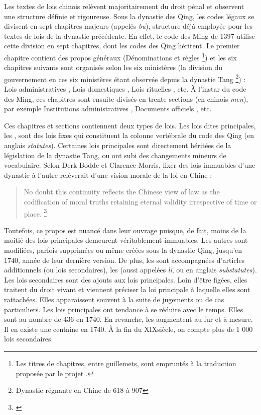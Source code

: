 Les textes de lois chinois relèvent majoritairement du droit pénal et observent une structure définie et rigoureuse. Sous la dynastie des Qing, les codes légaux se divisent en sept chapitres majeurs (appelés \textit{bu}), structure déjà employée pour les textes de lois de la dynastie précédente. En effet, le code des Ming de 1397 utilise cette division en sept chapitres, dont les codes des Qing héritent. Le premier chapitre contient des propos généraux (\og Dénominations et règles \fg \footnote{Les titres de chapitres, entre guillemets, sont empruntés à la traduction proposée par le projet \LSC.}) et les six chapitres suivants sont organisés selon les six ministères (la division du gouvernement en ces six ministères étant observée depuis la dynastie Tang \footnote{Dynastie régnante en Chine de 618 à 907}) : \og Lois administratives \fg, \og Lois domestiques \fg, \og Lois rituelles \fg, etc. À l'instar du code des Ming, ces chapitres sont ensuite divisés en trente sections (en chinois \textit{men}), par exemple \og Institutions administratives \fg, \og Documents officiels \fg, etc. 

Ces chapitres et sections contiennent deux types de lois. Les lois dites principales, les \lu, sont des lois fixes qui constituent la colonne vertébrale du code des Qing (en anglais \textit{statutes}). Certaines lois principales sont directement héritées de la législation de la dynastie Tang, ou ont subi des changements mineurs de vocabulaire. Selon Derk Bodde et Clarence Morris, fixer des lois immuables d'une dynastie à l'autre relèverait d'une vision morale de la loi en Chine : 
\begin{quote}
    No doubt this continuity reflects the Chinese view of law as the codification of moral truths retaining eternal validity irrespective of time or place. \footnote{\cite{law_in_imperial_china}}
\end{quote}

Toutefois, ce propos est nuancé dans leur ouvrage puisque, de fait, moins de la moitié des lois principales demeurent véritablement immuables. Les autres \lu sont modifiées, parfois supprimées ou même créées sous la dynastie Qing, jusqu'en 1740, année de leur dernière version. De plus, les \lu sont accompagnées d'articles additionnels (ou lois secondaires), les \li (aussi appelées \textit{li}, ou en anglais \textit{substatutes}). Les lois secondaires sont des ajouts aux lois principales. Loin d'être figées, elles traitent du droit vivant et viennent préciser la loi principale à laquelle elles sont rattachées. Elles apparaissent souvent à la suite de jugements ou de cas particuliers. Les lois principales ont tendance à se réduire avec le temps. Elles sont au nombre de 436 en 1740. En revanche, les \li augmentent au fur et à mesure. Il en existe une centaine en 1740. À la fin du XIX\ieme siècle, on compte plus de 1 000 lois secondaires. 

